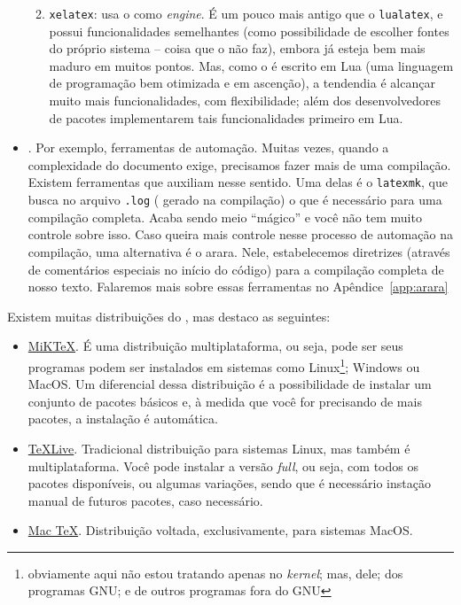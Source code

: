 \begin{itemize}
\begin{enumerate}
\begin{itemize}
                \end{itemize}
          \item \texttt{xelatex}: usa o  como \textit{engine}. 
                É um pouco mais antigo que o \texttt{lualatex}, e possui 
                funcionalidades semelhantes (como possibilidade de escolher  
                fontes do próprio sistema -- coisa que o  não faz), 
                embora já esteja bem mais maduro em muitos pontos.
                Mas, como o  é escrito em Lua (uma linguagem de 
                programação bem otimizada e em ascenção), a tendendia é alcançar 
                muito mais funcionalidades, com flexibilidade; além dos 
                desenvolvedores de pacotes implementarem tais funcionalidades 
                primeiro em Lua. 
        \end{enumerate}
  \item {}. Por exemplo, ferramentas de automação. 
        Muitas vezes, quando a complexidade do documento exige, precisamos fazer 
        mais de uma compilação. 
        Existem ferramentas que auxiliam nesse sentido. 
        Uma delas é o \texttt{latexmk}, que busca no arquivo \texttt{.log} (
        gerado na compilação) o que é necessário para uma compilação completa. 
        Acaba sendo meio ``mágico'' e você não tem muito controle sobre isso. 
        Caso queira mais controle nesse processo de automação na compilação, uma 
        alternativa é o {\arara arara}. 
        Nele, estabelecemos diretrizes (através de comentários especiais no 
        início do código) para a compilação completa de nosso texto. 
        Falaremos mais sobre essas ferramentas no Apêndice~\ref{app:arara}
\end{itemize}

Existem muitas distribuições do \LaTeXX, mas destaco as seguintes:

\begin{itemize}
  \item \href{https://miktex.org/}{\textsf{MiK\TeX}}. 
        É uma distribuição multiplataforma, ou seja, pode ser 
        seus programas podem ser instalados em sistemas como Linux\footnote{
          obviamente aqui não estou tratando apenas no \textit{kernel}; mas, 
          dele; dos programas GNU; e de outros programas fora do GNU
        }; Windows ou MacOS. 
        Um diferencial dessa distribuição é a possibilidade de instalar um 
        conjunto de pacotes básicos e, à medida que você for precisando de mais 
        pacotes, a instalação é automática. 
  \item \href{https://www.tug.org/texlive/}{\textsf{\TeX Live}}. 
        Tradicional distribuição para sistemas Linux, mas 
        também é multiplataforma. 
        Você pode instalar a versão \textit{full}, ou seja, com todos os pacotes 
        disponíveis, ou algumas variações, sendo que é necessário instação manual 
        de futuros pacotes, caso necessário. 
  \item \href{https://www.tug.org/mactex/}{\textsf{Mac \TeX}}. 
        Distribuição voltada, exclusivamente, para sistemas MacOS.
\end{itemize}


